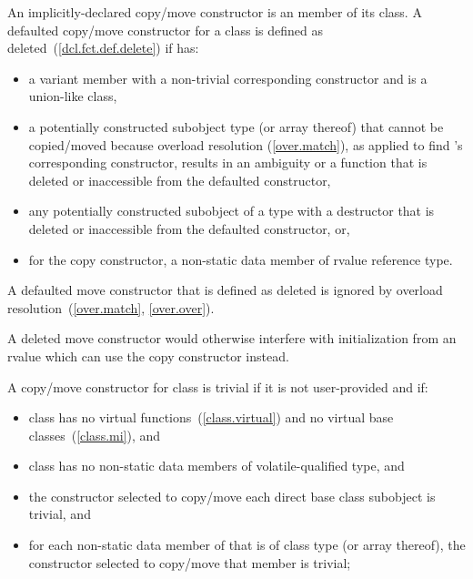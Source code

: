 \pnum
An implicitly-declared copy/move constructor is an
member of its class.
A defaulted copy/\brk{}move constructor for a class
   is defined as deleted~(\ref{dcl.fct.def.delete}) if  has:
\begin{itemize}
\item a variant member with a non-trivial corresponding constructor and
   is a union-like class,

\item a potentially constructed subobject type
   (or array thereof) that cannot be copied/moved because
  overload resolution (\ref{over.match}), as applied to find
  's 
  corresponding constructor, results in an ambiguity or 
  a function that is deleted or inaccessible from the
  defaulted constructor,

\item any potentially constructed subobject of a type
  with a destructor that is deleted or inaccessible from the defaulted
  constructor, or,

\item for the copy constructor, a non-static data member of rvalue reference type.
\end{itemize}

A defaulted move constructor that is defined as deleted is ignored by overload
resolution~(\ref{over.match}, \ref{over.over}).
\begin{note}
A deleted move constructor would otherwise interfere with initialization from
an rvalue which can use the copy constructor instead.
\end{note}

\pnum
{}%
%
A copy/move constructor for class
is
trivial
if it is not user-provided and if:

\begin{itemize}
\item
class
has no virtual functions~(\ref{class.virtual})
and no virtual base classes~(\ref{class.mi}), and

\item class  has no non-static data members of volatile-qualified type, and

\item
the constructor selected to copy/move each direct base class subobject is trivial, and

\item
for each non-static data member of
that is of class type (or array thereof),
the constructor selected to copy/move that member is trivial;
\end{itemize}

